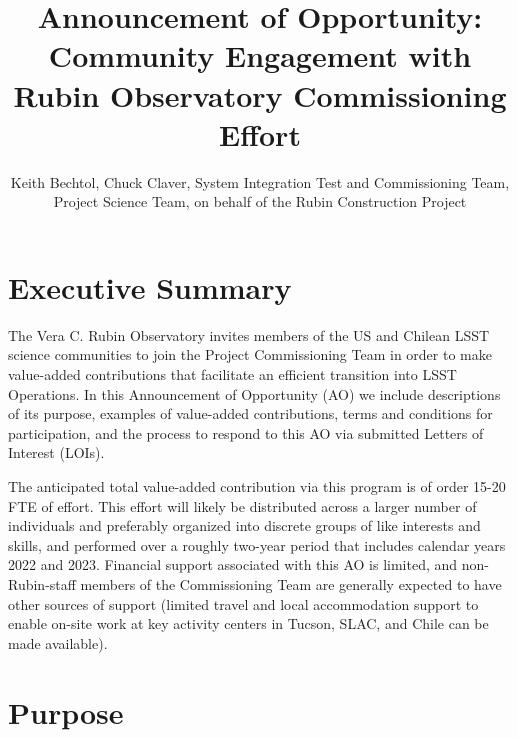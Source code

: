 \documentclass[SE,authoryear,toc,lsstdraft]{lsstdoc}
\title{Announcement of Opportunity: Community Engagement with Rubin Observatory Commissioning Effort}
\author{%
Keith Bechtol, Chuck Claver, System Integration Test and Commissioning Team, Project Science Team, on behalf of the Rubin Construction Project
}
\date{\vcsDate}
\begin{document}
\maketitle


\section{Executive Summary}

The Vera C. Rubin Observatory invites members of the US and Chilean LSST science communities to join the Project Commissioning Team in order to make value-added contributions that facilitate an efficient transition into LSST Operations. In this Announcement of Opportunity (AO) we include descriptions of its purpose, examples of value-added contributions, terms and conditions for participation, and the process to respond to this AO via submitted Letters of Interest (LOIs).

The anticipated total value-added contribution via this program is of order 15-20 FTE of effort. This effort will likely be distributed across a larger number of individuals and preferably organized into discrete groups of like interests and skills, and performed over a roughly two-year period that includes calendar years 2022 and 2023. Financial support associated with this AO is limited, and non-Rubin-staff members of the Commissioning Team are generally expected to have other sources of support (limited travel and local accommodation support to enable on-site work at key activity centers in Tucson, SLAC, and Chile can be made available).

\section{Purpose}
\label{purpose}
\end{document}
